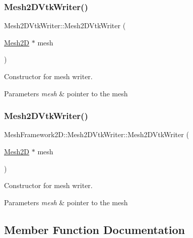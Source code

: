 \subsubsection{\texorpdfstring{Mesh2\+D\+Vtk\+Writer()}{Mesh2DVtkWriter()}\hspace{0.1cm}{\footnotesize\ttfamily [1/2]}}
{\footnotesize\ttfamily Mesh2\+D\+Vtk\+Writer\+::\+Mesh2\+D\+Vtk\+Writer (\begin{DoxyParamCaption}\item[{\hyperlink{classMeshFramework2D_1_1Mesh2D}{Mesh2D} $\ast$}]{mesh }\end{DoxyParamCaption})}



Constructor for mesh writer. 


\begin{DoxyParams}{Parameters}
{\em mesh} & pointer to the mesh \\
\hline
\end{DoxyParams}
\mbox{\label{classMeshFramework2D_1_1Mesh2DVtkWriter_a323326d3765fe1da21130de403d0b6b0}} 
\subsubsection{\texorpdfstring{Mesh2\+D\+Vtk\+Writer()}{Mesh2DVtkWriter()}\hspace{0.1cm}{\footnotesize\ttfamily [2/2]}}
{\footnotesize\ttfamily Mesh\+Framework2\+D\+::\+Mesh2\+D\+Vtk\+Writer\+::\+Mesh2\+D\+Vtk\+Writer (\begin{DoxyParamCaption}\item[{\hyperlink{classMeshFramework2D_1_1Mesh2D}{Mesh2D} $\ast$}]{mesh }\end{DoxyParamCaption})}



Constructor for mesh writer. 


\begin{DoxyParams}{Parameters}
{\em mesh} & pointer to the mesh \\
\hline
\end{DoxyParams}


\subsection{Member Function Documentation}
\mbox{\label{classMeshFramework2D_1_1Mesh2DVtkWriter_ab9efd52aa811ee091d442bf47e6596e0}} 
